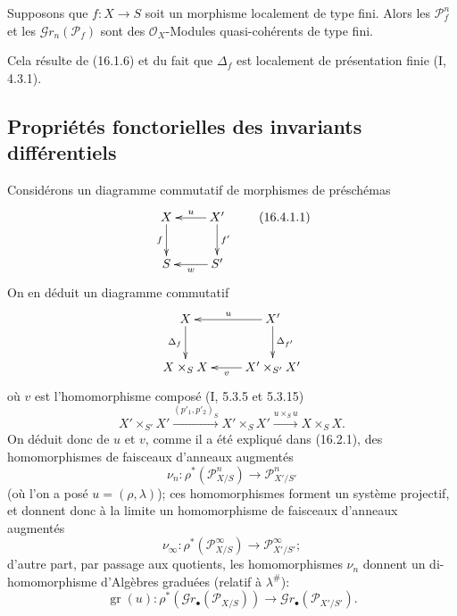 \begin{proposition}[16.3.9]
\label{IV.16.3.9}
Supposons que $f:X\to S$ soit un morphisme localement de type fini. Alors les
$\mathscr{P}_f^n$ et les $\mathscr{G}r_n(\mathscr{P}_f)$ sont des
$\mathcal{O}_X$-Modules quasi-cohérents de type fini.
\end{proposition}

Cela résulte de (16.1.6) et du fait que $\Delta_f$ est localement de présentation
finie (I, 4.3.1).

\subsection{Propriétés fonctorielles des invariants différentiels}

\begin{env}[16.4.1]
\label{IV.16.4.1}
Considérons un diagramme commutatif de morphismes de préschémas
\[
  \xymatrix{
    X \ar[d]_-{f} & X' \ar[l]_-u \ar[d]^-{f'} \\
    S & S' \ar[l]^-w
  }
  \tag{16.4.1.1}
  \label{IV.16.4.1.1}
\]
On en déduit un diagramme commutatif
\[
  \xymatrix{
    X \ar[d]_-{\Delta_f} & X' \ar[l]_-u \ar[d]^-{\Delta_{f'}} \\
    X\times_S X & X'\times_{S'}X' \ar[l]^-v
  }
\]
où $v$ est l'homomorphisme composé (I, 5.3.5 et 5.3.15)
\[
  X'\times_{S'}X'
  \xrightarrow{(p'_1,p'_2)_S}X'\times_S X'
  \xrightarrow{u\times_S u}X\times_S X.
  \tag{16.4.1.2}
  \label{IV.16.4.1.2}
\]
On déduit donc de $u$ et $v$, comme il a été expliqué dans (16.2.1), des
homomorphismes de faisceaux d'anneaux augmentés
\[
  \nu_n:\rho^*(\mathscr{P}_{X/S}^n)\longrightarrow
  \mathscr{P}_{X'/S'}^n
  \tag{16.4.1.3}
  \label{IV.16.4.1.3}
\]
(où l'on a posé $u=(\rho,\lambda)$); ces homomorphismes forment un système
projectif, et donnent donc à la limite un homomorphisme de faisceaux d'anneaux
augmentés
\[
  \nu_\infty:\rho^*(\mathscr{P}_{X/S}^\infty)\longrightarrow
  \mathscr{P}_{X'/S'}^\infty;
  \tag{16.4.1.4}
  \label{IV.16.4.1.4}
\]
d'autre part, par passage aux quotients, les homomorphismes $\nu_n$ donnent un
di-homomorphisme d'Algèbres graduées (relatif à $\lambda^\#$):
\[
  \operatorname{gr}(u):\rho^*(\mathscr{G}r_\bullet(\mathscr{P}_{X/S}))
  \longrightarrow\mathscr{G}r_\bullet(\mathscr{P}_{X'/S'}).
  \tag{16.4.1.5}
  \label{IV.16.4.1.5}
\]
\end{env}

